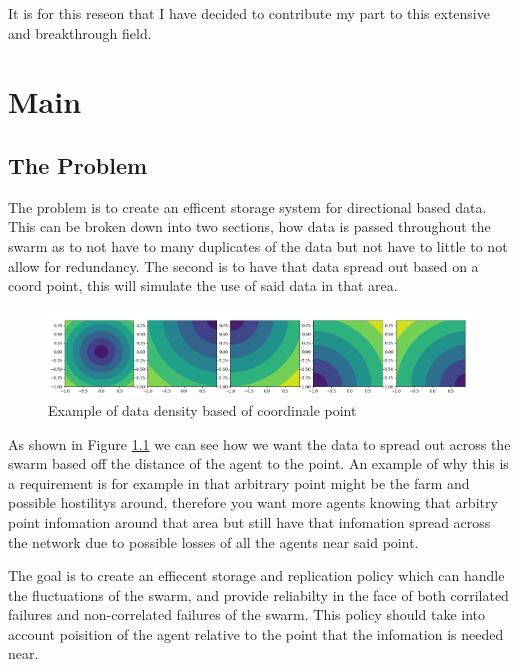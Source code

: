 \documentclass{UoYCSproject}
\begin{document}
It is for this reseon that I have decided to contribute my part to this extensive and breakthrough field.


\chapter{Main}
\label{cha:Main}


\section{The Problem}
\label{sec:Problem}

The problem is to create an efficent storage system for directional based data.
This can be broken down into two sections, how data is passed throughout the swarm as to not have to many duplicates of the data but not have to little to not allow for redundancy.
The second is to have that data spread out based on a coord point, this will simulate the use of said data in that area.

\begin{figure}[htb]
\label{fig:popdensity}
\begin{center}
\centering
\includegraphics[width=\linewidth]{"./Memory_Pop_Density.png"}
\caption{Example of data density based of coordinale point}
\end{center}
\end{figure}

As shown in Figure \ref{fig:popdensity} we can see how we want the data to spread out across the swarm based off the distance of the agent to the point.
An example of why this is a requirement is for example in that arbitrary point might be the farm and possible hostilitys around, therefore you want more agents knowing that arbitry point infomation around that area but still have that infomation spread across the network due to possible losses of all the agents near said point.

The goal is to create an effiecent storage and replication policy which can handle the fluctuations of the swarm, and provide reliabilty in the face of both corrilated failures and non-correlated failures of the swarm.
This policy should take into account poisition of the agent relative to the point that the infomation is needed near.
\end{document}
